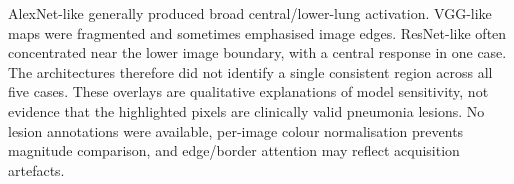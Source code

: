 \documentclass[10pt,a4paper]{article}
\begin{document}
AlexNet-like generally produced broad central/lower-lung activation. VGG-like
maps were fragmented and sometimes emphasised image edges. ResNet-like often
concentrated near the lower image boundary, with a central response in one
case. The architectures therefore did not identify a single consistent region
across all five cases. These
overlays are qualitative explanations of model sensitivity, not evidence that
the highlighted pixels are clinically valid pneumonia lesions. No lesion
annotations were available, per-image colour normalisation prevents magnitude
comparison, and edge/border attention may reflect acquisition artefacts.
\end{document}
